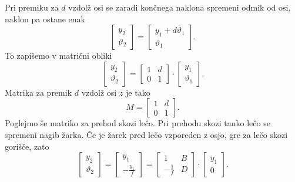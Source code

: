 Pri premiku za $d$ vzdolž osi se zaradi končnega naklona spremeni odmik od osi, naklon pa ostane enak
\begin{equation}
\left[\begin{array}{c}
y_{2}\\
\vartheta_{2}
\end{array}\right]=\left[\begin{array}{c}
y_{1}+d\vartheta_{1}\\
\vartheta_{1}
\end{array}\right].
\end{equation}
To zapišemo v matrični obliki
\begin{equation}
\left[\begin{array}{c}
y_{2}\\
\vartheta_{2}
\end{array}\right]=\left[\begin{array}{cc}
1 & d\\
0 & 1
\end{array}\right]\cdot\left[\begin{array}{c}
y_{1}\\
\vartheta_{1}
\end{array}\right].
\end{equation}
Matrika za premik $d$ vzdolž osi $z$ je tako
\begin{equation}
M= \left[\begin{array}{cc}
1 & d\\
0 & 1
\end{array}\right].
\label{eq:MABCD1}
\end{equation}
Poglejmo še matriko za prehod skozi lečo. 
Pri prehodu skozi tanko lečo se spremeni nagib žarka. Če je žarek pred
lečo vzporeden z osjo, gre za lečo skozi gorišče, zato 
\begin{equation}
\left[\begin{array}{c}
y_{2}\\
\vartheta_{2}
\end{array}\right]=\left[\begin{array}{c}
y_{1}\\
-\frac{y_{1}}{f}
\end{array}\right]=\left[\begin{array}{cc}
1 & B\\
-\frac{1}{f} & D
\end{array}\right]\cdot\left[\begin{array}{c}
y_{1}\\
0
\end{array}\right].
\end{equation}
